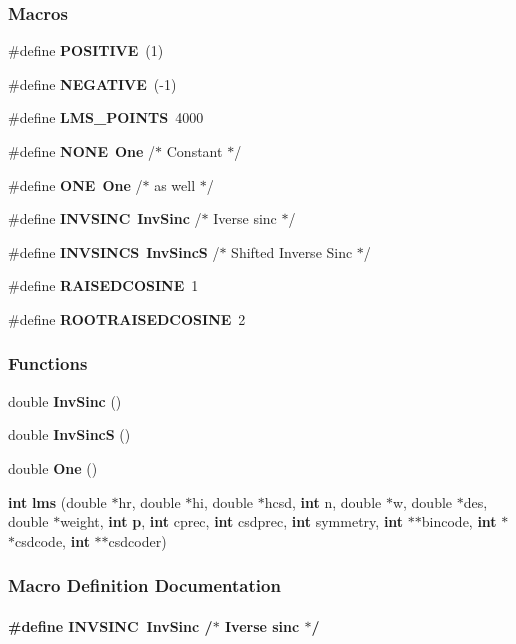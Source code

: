 \subsubsection*{Macros}
\begin{DoxyCompactItemize}
\item 
\#define {\bf P\+O\+S\+I\+T\+I\+VE}~(1)
\item 
\#define {\bf N\+E\+G\+A\+T\+I\+VE}~(-\/1)
\item 
\#define {\bf L\+M\+S\+\_\+\+P\+O\+I\+N\+TS}~4000
\item 
\#define {\bf N\+O\+NE}~{\bf One}		/$\ast$ Constant $\ast$/
\item 
\#define {\bf O\+NE}~{\bf One}		/$\ast$ as well $\ast$/
\item 
\#define {\bf I\+N\+V\+S\+I\+NC}~{\bf Inv\+Sinc}		/$\ast$ Iverse sinc $\ast$/
\item 
\#define {\bf I\+N\+V\+S\+I\+N\+CS}~{\bf Inv\+SincS}	/$\ast$ Shifted Inverse Sinc $\ast$/
\item 
\#define {\bf R\+A\+I\+S\+E\+D\+C\+O\+S\+I\+NE}~1
\item 
\#define {\bf R\+O\+O\+T\+R\+A\+I\+S\+E\+D\+C\+O\+S\+I\+NE}~2
\end{DoxyCompactItemize}
\subsubsection*{Functions}
\begin{DoxyCompactItemize}
\item 
double {\bf Inv\+Sinc} ()
\item 
double {\bf Inv\+SincS} ()
\item 
double {\bf One} ()
\item 
{\bf int} {\bf lms} (double $\ast$hr, double $\ast$hi, double $\ast$hcsd, {\bf int} n, double $\ast$w, double $\ast$des, double $\ast$weight, {\bf int} {\bf p}, {\bf int} cprec, {\bf int} csdprec, {\bf int} symmetry, {\bf int} $\ast$$\ast$bincode, {\bf int} $\ast$$\ast$csdcode, {\bf int} $\ast$$\ast$csdcoder)
\end{DoxyCompactItemize}


\subsubsection{Macro Definition Documentation}
\paragraph[{I\+N\+V\+S\+I\+NC}]{\setlength{\rightskip}{0pt plus 5cm}\#define I\+N\+V\+S\+I\+NC~{\bf Inv\+Sinc}		/$\ast$ Iverse sinc $\ast$/}\label{lms_8h_a779f6b0bf48d68c12bb90544ede149b8}


